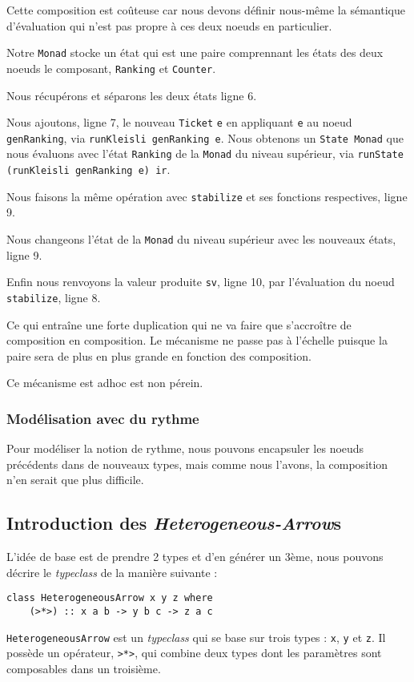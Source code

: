\documentclass{llncs}
\newcommand{\SAs}{\emph{Heterogeneous-Arrow}s }
\newcommand{\HA}{\lstinline{HeterogeneousArrow} }
\begin{document}
Cette composition est coûteuse car nous devons définir nous-même la sémantique
d'évaluation qui n'est pas propre à ces deux noeuds en particulier.

Notre \lstinline{Monad} stocke un état qui est une paire comprennant les états
des deux noeuds le composant, \lstinline{Ranking} et \lstinline{Counter}.

Nous récupérons et séparons les deux états ligne 6.

Nous ajoutons, ligne 7, le nouveau \lstinline{Ticket} \lstinline{e} en appliquant \lstinline{e}
au noeud \lstinline{genRanking}, via \lstinline{runKleisli genRanking e}.
Nous obtenons un \lstinline{State Monad} que nous évaluons avec l'état \lstinline{Ranking}
de la \lstinline{Monad} du niveau supérieur, via \lstinline{runState (runKleisli genRanking e) ir}.

Nous faisons la même opération avec \lstinline{stabilize} et ses fonctions respectives,
ligne 9.

Nous changeons l'état de la \lstinline{Monad} du niveau supérieur avec les nouveaux
états, ligne 9.

Enfin nous renvoyons la valeur produite \lstinline{sv}, ligne 10, par l'évaluation
du noeud \lstinline{stabilize}, ligne 8.

Ce qui entraîne une forte duplication qui ne va faire que s'accroître de
composition en composition.
Le mécanisme ne passe pas à l'échelle puisque la paire sera de plus en plus
grande en fonction des composition.

Ce mécanisme est adhoc est non pérein.

\subsubsection{Modélisation avec du rythme}
Pour modéliser la notion de rythme, nous pouvons encapsuler les noeuds
précédents dans de nouveaux types, mais comme nous l'avons, la composition
n'en serait que plus difficile.

\subsection{Introduction des \SAs}
L'idée de base est de prendre 2 types et d'en générer un 3ème, nous pouvons
décrire le \emph{typeclass} de la manière suivante :
\begin{lstlisting}
class HeterogeneousArrow x y z where
    (>*>) :: x a b -> y b c -> z a c
\end{lstlisting}
\HA est un \emph{typeclass} qui se base sur trois types : \lstinline{x},
\lstinline{y} et \lstinline{z}.
Il possède un opérateur, \lstinline{>*>}, qui combine deux types dont les
paramètres sont composables dans un troisième.
\end{document}
